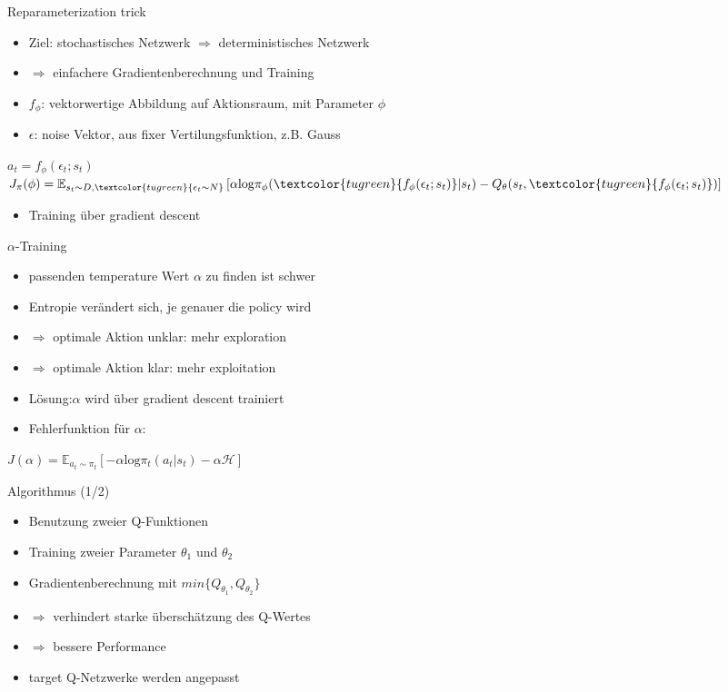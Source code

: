 \begin{frame}{Reparameterization trick}
\begin{itemize}
\item Ziel: stochastisches Netzwerk $\Rightarrow$ deterministisches Netzwerk
\item[] $\Rightarrow$ einfachere Gradientenberechnung und Training
\item $f_{\phi}$: vektorwertige Abbildung auf Aktionsraum, mit Parameter $\phi$
\item $\epsilon$: noise Vektor, aus fixer Vertilungsfunktion, z.B. Gauss \\[12pt]
\end{itemize}
\textcolor{tugreen}{$a_{t}=f_{\phi}(\epsilon_{t};s_{t})$} \\[6pt]
$J_{\pi}(\phi)=\mathbb{E}_{s_{t}\sim D,\textcolor{tugreen}{\epsilon_{t}\sim N}}\left[\alpha\mathrm{log}\pi_{\phi}(\textcolor{tugreen}{f_{\phi}(\epsilon_{t};s_{t})}|s_{t})-Q_{\theta}(s_{t},\textcolor{tugreen}{f_{\phi}(\epsilon_{t};s_{t})})\right]$ \\[12pt]

\begin{itemize}
\item Training über gradient descent
\end{itemize}
\end{frame}

\begin{frame}{$\alpha$-Training}
\begin{itemize}
\item passenden temperature Wert $\alpha$ zu finden ist schwer
\item Entropie verändert sich, je genauer die policy wird
\item[] $\Rightarrow$ optimale Aktion unklar: mehr exploration
\item[] $\Rightarrow$ optimale Aktion klar: mehr exploitation \\[12pt]

\item Lösung:$\alpha$ wird über gradient descent trainiert
\item Fehlerfunktion für $\alpha$:
\end{itemize}
\center$J(\alpha)=\mathbb{E}_{a_{t}\sim\pi_{t}}\left[-\alpha \mathrm{log}\pi_{t}(a_{t}|s_{t})-\alpha \mathcal{H}\right]$
\end{frame}

\begin{frame}{Algorithmus (1/2)}
\begin{itemize}
\item Benutzung zweier Q-Funktionen
\item Training zweier Parameter $\theta_{1}$ und $\theta_{2}$
\item Gradientenberechnung mit $min\{Q_{\theta_{1}},Q_{\theta_{2}}\}$
\item[] $\Rightarrow$ verhindert starke überschätzung des Q-Wertes
\item[] $\Rightarrow$ bessere Performance
\item target Q-Netzwerke werden angepasst
\end{itemize}
\end{frame}

